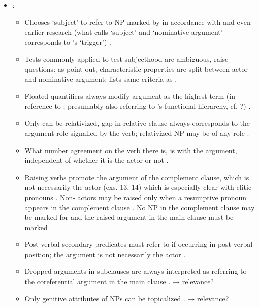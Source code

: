 \begin{itemize}
	\item \citet[19--52]{kroeger1991}:
	\begin{itemize}
		\item Chooses `subject' to refer to NP marked by  in accordance
		with \citet[208--209]{mckaughan1973} and even earlier research (what
		\cite{kroeger1991} calls `subject' and `nominative argument'
		corresponds to \cite{schachter2015}'s `trigger') 
		\citep[19]{kroeger1991}.
		\item Tests commonly applied to test subjecthood are ambiguous, raise
		questions: as \textcites{schachter1976}{schachter1977} point out,
		characteristic properties are split between actor and nominative argument; lists same criteria as \citet[1674]{schachter2015}
		\citep[20]{kroeger1991}.
		\item Floated quantifiers always modify \Nom{} argument as the
		highest term (in reference to \cite[501]{schachter1976}; presumably
		also referring to \Lfg{}'s functional hierarchy, cf.
		\cite[230--231]{bresnan2016}?) \citep[23]{kroeger1991}.
		\item Only \Nom{} can be relativized, gap in relative clause always
		corresponds to the argument role signalled by the verb; relativized NP
		may be of any role \citep[23--24]{kroeger1991}.
		\item What number agreement on the verb there is, is with the \Nom{}
		argument, independent of whether it is the actor or not
		\citep[24--25]{kroeger1991}.
		\item Raising verbs promote the \Nom{} argument of the complement
		clause, which is not necessarily the actor (exs. 13, 14) which is
		especially clear with clitic pronouns \citep[26]{kroeger1991}.
		Non-\Nom{} actors may be raised only when a resumptive pronoun appears
		in the complement clause \citep[28]{kroeger1991}. No NP in the
		complement clause may be marked for \Nom{} and the raised argument in
		the main clause must be marked \Nom{} \cite[29]{kroeger1991}.
		\item Post-verbal secondary predicates must refer to \Nom{} if
		occurring in post-verbal position; the \Nom{} argument is not
		necessarily the actor \citep[29--30]{kroeger1991}.
		\item Dropped \Nom{} arguments in subclauses are always interpreted as
		referring to the coreferential \Nom{} argument in the main clause
		\citep[30--31]{kroeger1991}. → relevance?
		\item Only genitive attributes of \Nom{} NPs can be topicalized
		\citep[31]{kroeger1991}. → relevance?

\end{itemize}
\end{itemize}
